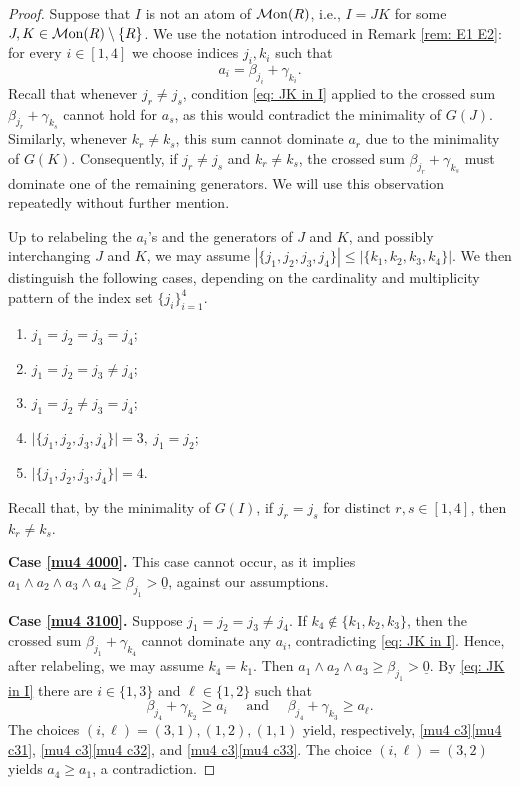 \documentclass[a4paper,10pt,reqno]{amsart}
\theoremstyle{definition}
\theoremstyle{definition}
\providecommand\Mon{{\mathcal{M}{\rm on}}}
\begin{document}
\begin{proof}
Suppose that $I$ is not an atom of $\Mon(R)$, i.e., $I=JK$ for some $J,K\in\Mon(R)\setminus\{R\}$. We use the notation introduced in Remark \ref{rem: E1 E2}: for every $i\in[1,4]$ we choose indices $j_i,k_i$ such that
\[
a_i=\beta_{j_i}+\gamma_{k_i}.
\]
Recall that whenever $j_r\neq j_s$, condition \ref{eq: JK in I} applied to the crossed sum $\beta_{j_r}+\gamma_{k_s}$ cannot hold for $a_s$, as this would contradict the minimality of $G(J)$. Similarly, whenever $k_r\neq k_s$, this sum cannot dominate $a_r$ due to the minimality of $G(K)$. Consequently, if $j_r\neq j_s$ and $k_r\neq k_s$, the crossed sum $\beta_{j_r}+\gamma_{k_s}$ must dominate one of the remaining generators. We will use this observation repeatedly without further mention.

Up to relabeling the $a_i$'s and the generators of $J$ and $K$, and possibly interchanging $J$ and $K$, we may assume $|\{j_1,j_2,j_3,j_4\}|\le|\{k_1,k_2,k_3,k_4\}|$. We then distinguish the following cases, depending on the cardinality and multiplicity pattern of the index set $\{j_i\}_{i=1}^4$.
\begin{enumerate}[label=\textup{(\arabic{*})}, mode=unboxed]
        \item\label{mu4 4000} $j_1 = j_2 = j_3 = j_4$;
        \item\label{mu4 3100}  $j_1=j_2=j_3\neq j_4$;
        
        \item\label{mu4 2200} $j_1=j_2\ne j_3=j_4$;
        
        \item\label{mu4 2110} $\lvert\{j_1,j_2,j_3,j_4\}\rvert = 3,\ j_1=j_2$;
        
        \item\label{mu4 1111} $\lvert\{j_1,j_2,j_3,j_4\}\rvert=4$.
\end{enumerate}
Recall that, by the minimality of $G(I)$, if $j_r=j_{s}$ for distinct $r,s\in[1,4]$, then $k_r\ne k_{s}$.

\smallskip
\textbf{Case \ref{mu4 4000}.} This case cannot occur, as it implies $a_1\wedge a_2\wedge a_3\wedge a_4 \ge \beta_{j_1} > \underline 0$, against our assumptions.

\smallskip
\textbf{Case \ref{mu4 3100}.} Suppose $j_1=j_2=j_3\neq j_4$. If $k_4\notin\{k_1,k_2,k_3\}$, then the crossed sum $\beta_{j_1}+\gamma_{k_4}$ cannot dominate any $a_i$, contradicting \ref{eq: JK in I}. Hence, after relabeling, we may assume $k_4=k_1$. Then $a_1\wedge a_2\wedge a_3\ge \beta_{j_1}>\underline 0.$ By \ref{eq: JK in I} there are $i\in \{1,3\}$ and $\ell\in\{1,2\}$ such that
\[\beta_{j_4}+\gamma_{k_2}\ge a_i \quad\text{ and }\quad \beta_{j_4}+\gamma_{k_3}\ge a_\ell.\] The choices $(i, \ell) = (3, 1), (1, 2), (1, 1)$ yield, respectively, \ref{mu4 c3}\ref{mu4 c31}, \ref{mu4 c3}\ref{mu4 c32}, and \ref{mu4 c3}\ref{mu4 c33}. The choice $(i,\ell)=(3,2)$ yields $a_4\ge a_1$, a contradiction.


\end{proof}
\end{document}
